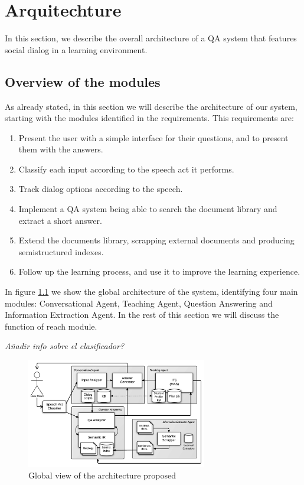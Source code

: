 \chapter{Arquitechture}
\label{chap:architecture}

\begin{chapterintro}

In this section, we describe the overall architecture of a QA system that features social dialog in a learning environment.
 
\end{chapterintro}

\cleardoublepage

\section{Overview of the modules}

As already stated, in this section we will describe the architecture of our system, starting with the modules identified in the requirements. This requirements are:
\begin{enumerate}[noitemsep, label=(\roman*)]
 \item Present the user with a simple interface for their questions, and to present them with the answers.
 \item Classify each input according to the speech act it performs.
 \item Track dialog options according to the speech.
 \item Implement a QA system being able to search the document library and extract a short answer.
 \item Extend the documents library, scrapping external documents and producing semistructured indexes.
 \item Follow up the learning process, and use it to improve the learning experience. 
\end{enumerate}

In figure \ref{fig:arch1} we show the global architecture of the system, identifying four main modules: Conversational Agent, Teaching Agent, Question Answering and Information Extraction Agent. In the rest of this section we will discuss the function of reach module.

\color{red}\emph{Añadir info sobre el clasificador?}\color{black}


\begin{figure}[!htbp]
    \centering
    \includegraphics[width=0.7\textwidth]{img/arch/global_1-3.png}
    \caption{Global view of the architecture proposed}
    \label{fig:arch1}
\end{figure}



